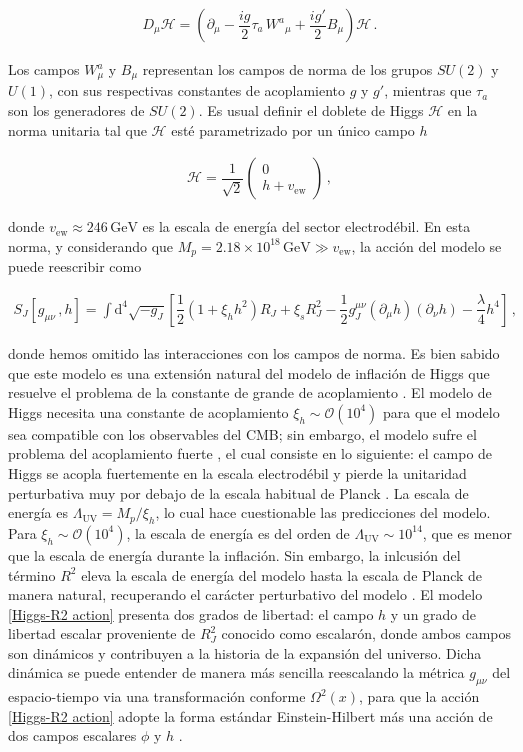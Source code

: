 \documentclass[12pt,a4paper,english,nofootinbib]{revtex4}
\newcommand{\dif}{\mathrm{d}}
\newcommand{\beq}{\begin{eqnarray}}
\newcommand{\enq}{\end{eqnarray}}
\begin{document}
\beq 
D_\mu\mathcal{H} = \left(\partial_\mu - \dfrac{ig}{2}\tau_a\,W^a{}_\mu  + \dfrac{ig'}{2}B_\mu\right)\mathcal{H}\,.
\enq 

Los campos $W^a_\mu$ y $B_\mu$ representan los campos de norma de los grupos $SU(2)$ y $U(1)$, con sus respectivas constantes de acoplamiento $g$ y $g'$, mientras que $\tau_a$ son los generadores de $SU(2)$. Es usual definir el doblete de Higgs $\mathcal{H}$ en la norma unitaria tal que $\mathcal{H}$ esté parametrizado por un único campo $h$

\beq 
\mathcal{H} = \dfrac{1}{\sqrt{2}}\begin{pmatrix}
    0\\
    h + v_\mathrm{ew}
\end{pmatrix}\,,
\enq 

donde $v_\mathrm{ew} \approx 246\,\mathrm{GeV}$ es la escala de energía del sector electrodébil. En esta norma, y considerando que  $M_p = 2.18 \times10^{18}\,\mathrm{GeV}\gg v_\mathrm{ew}$, la acción del modelo se puede reescribir como \cite{EMA2017}

\beq 
    S_J[g_{\mu\nu}\,,h] = \int \dif^4\sqrt{-g_J}\left[ \dfrac{1}{2}\left(1 +  \xi_h h^2\right)R_J + \xi_s R_J^2 - \dfrac{1}{2}g_J^{\mu\nu}(\partial_\mu h)(\partial_\nu h) - \dfrac{\lambda}{4}h^4  \right]\,,
    \label{Higgs-R2 action}
\enq 

donde hemos omitido las interacciones con los campos de norma. Es bien sabido que este modelo es una extensión natural del modelo de inflación de Higgs que resuelve el problema de la constante de grande de acoplamiento \cite{GORBUNOV2019}. El modelo de Higgs necesita una constante de acoplamiento  $\xi_h \sim \mathcal{O}(10^4)$ para que el modelo sea compatible con los observables del CMB; sin embargo, el modelo sufre el problema del acoplamiento fuerte \cite{Barbon2009, Burgess2009, BEZRUKOV2008}, el cual consiste en lo siguiente: el campo de Higgs se acopla fuertemente en la escala electrodébil y pierde la unitaridad perturbativa muy por debajo de la escala habitual de Planck \cite{GORBUNOV2019}. La escala de energía es $\Lambda_\text{UV} = M_p/\xi_h$, lo cual hace cuestionable las predicciones del modelo. Para $\xi_h \sim \mathcal{O}(10^4)$, la escala de energía es del orden de $\Lambda_\text{UV} \sim 10^{14}$, que es menor que la escala de energía durante la inflación. Sin embargo, la inlcusión del término $R^2$ eleva la escala de energía del modelo hasta la escala de Planck de manera natural, recuperando el carácter perturbativo del modelo \cite{EMA2017,GORBUNOV2019}. El modelo \eqref{Higgs-R2 action} presenta dos grados de libertad: el campo $h$ y un grado de libertad escalar proveniente de $R^2_J$ conocido como escalarón, donde ambos campos son dinámicos y contribuyen a la historia de la expansión del universo. Dicha dinámica se puede entender de manera más sencilla reescalando la métrica $g_{\mu\nu}$  del espacio-tiempo via una transformación conforme $\Omega^2(x)$, para que la acción \eqref{Higgs-R2 action} adopte la forma estándar Einstein-Hilbert más una acción de dos campos escalares $\phi$ y $h$ \cite{Kaiser2010a}. 
\end{document}
